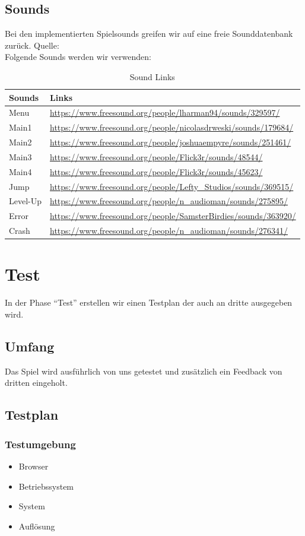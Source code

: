 \subsection{Sounds}
Bei den implementierten Spielsounds greifen wir auf eine freie Sounddatenbank zurück. Quelle: \cite{sounds}\\
Folgende Sounds werden wir verwenden:
\begin{table}[h]
	\centering
	\begin{tabular}{|l|l|}
		\toprule
		\textbf{Sounds}& \textbf{Links}\\
		\midrule
		Menu & \url{https://www.freesound.org/people/lharman94/sounds/329597/}\\ 
		Main1 & \url{https://www.freesound.org/people/nicolasdrweski/sounds/179684/}\\
		Main2  & \url{https://www.freesound.org/people/joshuaempyre/sounds/251461/}\\ 
		Main3  & \url{https://www.freesound.org/people/Flick3r/sounds/48544/}\\
		Main4 & \url{https://www.freesound.org/people/Flick3r/sounds/45623/}\\
		Jump & \url{https://www.freesound.org/people/Lefty_Studios/sounds/369515/}\\
		Level-Up & \url{https://www.freesound.org/people/n_audioman/sounds/275895/}\\
		Error & \url{https://www.freesound.org/people/SamsterBirdies/sounds/363920/}\\
		Crash & \url{https://www.freesound.org/people/n_audioman/sounds/276341/}\\
		\bottomrule
	\end{tabular}
	\caption{Sound Links}
\end{table}
\section{Test}
In der Phase ``Test'' erstellen wir einen Testplan der auch an dritte ausgegeben wird.
\subsection{Umfang}
Das Spiel wird ausführlich von uns getestet und zusätzlich ein Feedback von dritten eingeholt.
\subsection{Testplan}
\subsubsection{Testumgebung}
\begin{itemize}
	\item Browser
	\item Betriebssystem
	\item System
	\item Auflösung
\end{itemize}
